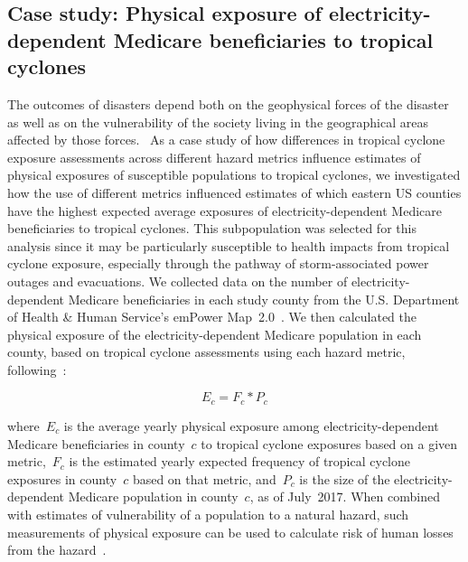 \subsection*{Case study: Physical exposure of electricity-dependent Medicare
beneficiaries to tropical cyclones}

The outcomes of disasters depend both on the geophysical forces of the disaster
as well as on the vulnerability of the society living in the geographical areas
affected by those forces.~\parencite{chakraborty2005population,
anderson2003community, cutter1996vulnerability} As a case study of how
differences in tropical cyclone exposure assessments across different hazard
metrics influence estimates of physical exposures of susceptible populations to
tropical cyclones, we investigated how the use of different metrics influenced
estimates of which eastern \ac{US} counties have the highest expected average
exposures of electricity-dependent Medicare beneficiaries to tropical cyclones.
This subpopulation was selected for this analysis since it may be particularly
susceptible to health impacts from tropical cyclone exposure, especially
through the pathway of storm-associated power outages and evacuations. We
collected data on the number of electricity-dependent Medicare beneficiaries in
each study county from the U.S. Department of Health \& Human Service's emPower
Map~2.0~\parencite{empower}. We then calculated the physical exposure of the
electricity-dependent Medicare population in each county, based on tropical
cyclone assessments using each hazard metric,
following~\parencite{peduzzi2009assessing}:

\begin{equation}
E_c = F_c * P_c
\end{equation}

\noindent where~$E_c$ is the average yearly physical exposure among
electricity-dependent Medicare beneficiaries in county~$c$ to tropical cyclone
exposures based on a given metric,~$F_c$ is the estimated yearly expected
frequency of tropical cyclone exposures in county~$c$ based on that metric,
and~$P_c$ is the size of the electricity-dependent Medicare population in
county~$c$, as of July~2017. When combined with estimates of vulnerability of a
population to a natural hazard, such measurements of physical exposure can be
used to calculate risk of human losses from the
hazard~\parencite{peduzzi2009assessing}.



